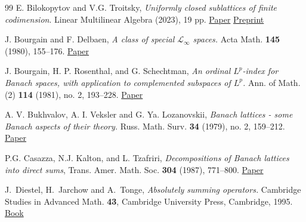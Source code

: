 \documentclass[11pt]{amsart}
\theoremstyle{definition}
\numberwithin{equation}{section}
\begin{document}
\begin{thebibliography}{99}
E. Bilokopytov and V.G. Troitsky, \textit{Uniformly closed sublattices of finite codimension}. Linear Multilinear Algebra (2023), 19 pp. \href{https://www.tandfonline.com/doi/full/10.1080/03081087.2023.2242569}{Paper} \href{https://arxiv.org/abs/2210.08805}{Preprint}



 J. Bourgain and F. Delbaen, \emph{A class of special $\mathcal{L}_\infty$ spaces.} Acta Math. \textbf{145} (1980), 155--176. \href{https://doi.org/10.1007/BF02414188}{Paper}

J. Bourgain, H. P. Rosenthal, and G. Schechtman, \emph{An ordinal $L^p$-index for Banach spaces, with application to complemented subspaces of $L^p$.} Ann. of Math. (2) \textbf{114} (1981), no. 2, 193--228. \href{https://doi.org/10.2307/1971293}{Paper}


A. V. Bukhvalov, A. I. Veksler and G. Ya. Lozanovskii, \emph{Banach lattices - some Banach aspects of their theory.}
Russ. Math. Surv. \textbf{34} (1979), no. 2, 159--212. \href{https://doi.org/10.1070/RM1979v034n02ABEH002909}{Paper}


P.G. Casazza, N.J. Kalton, and L. Tzafriri,
\textit{Decompositions of Banach lattices into direct sums}, Trans. Amer. Math. Soc. \textbf{304} (1987), 771--800. \href{https://www.ams.org/journals/tran/1987-304-02/S0002-9947-1987-0911095-9/}{Paper}


J.~Diestel, H.~Jarchow and A.~Tonge, \emph{Absolutely summing operators.}
  Cambridge Studies in Advanced Math. \textbf{43}, Cambridge University
  Press, Cambridge, 1995. \href{https://doi.org/10.1017/CBO9780511526138}{Book}














\end{thebibliography}
\end{document}

